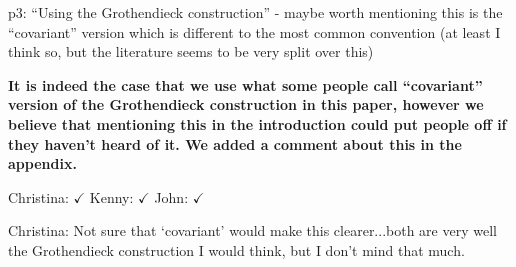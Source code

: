 \documentclass[reqno]{amsart}
\def\chris{\color{purple} Christina: }
\def\john{\color{red} John: }
\def\kenny{\color{blue} Kenny: }
\begin{document}
\begin{enumerate}
{%







\item p3: “Using the Grothendieck construction” - maybe worth mentioning this is the “covariant” version which is different to the most common 
convention 
(at least I think so, but the literature seems to be very split over this)

{\bf It is indeed the case that we use what some people call ``covariant'' version of the Grothen\-dieck construction in this paper, however we 
believe 
that mentioning this in the introduction could put people off if they haven't heard of it. We added a comment about this in the 
appendix.} 

{\chris $\checkmark$} {\kenny $\checkmark$} {\john $\checkmark$}

\iffalse
{\chris Not sure that `covariant' would make this clearer...both are very well the Grothendieck construction I would think, but I don't mind that 
much.}

}
\end{enumerate}
\end{document}
